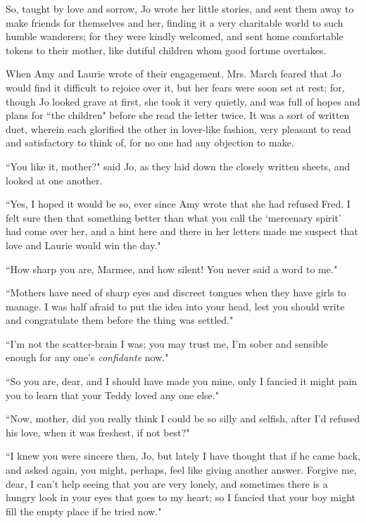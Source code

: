So, taught by love and sorrow, Jo wrote her little stories, and sent
them away to make friends for themselves and her, finding it a very
charitable world to such humble wanderers; for they were kindly
welcomed, and sent home comfortable tokens to their mother, like dutiful
children whom good fortune overtakes.

When Amy and Laurie wrote of their engagement, Mrs. March feared that Jo
would find it difficult to rejoice over it, but her fears were soon set
at rest; for, though Jo looked grave at first, she took it very quietly,
and was full of hopes and plans for ``the children" before she read the
letter twice. It was a sort of written duet, wherein each glorified the
other in lover-like fashion, very pleasant to read and satisfactory to
think of, for no one had any objection to make.

``You like it, mother?" said Jo, as they laid down the closely written
sheets, and looked at one another.

``Yes, I hoped it would be so, ever since Amy wrote that she had refused
Fred. I felt sure then that something better than what you call the
`mercenary spirit' had come over her,
and a hint here and there in her letters made me suspect that love and
Laurie would win the day."

``How sharp you are, Marmee, and how silent! You never said a word to
me."

``Mothers have need of sharp eyes and discreet tongues when they have
girls to manage. I was half afraid to put the idea into your head, lest
you should write and congratulate them before the thing was settled."

``I'm not the scatter-brain I was; you may trust me,
I'm sober and sensible enough for any
one's \emph{confidante} now."

``So you are, dear, and I should have made you mine, only I fancied it
might pain you to learn that your Teddy loved any one else."

``Now, mother, did you really think I could be so silly and selfish,
after I'd refused his love, when it was freshest, if not
best?"

``I knew you were sincere then, Jo, but lately I have thought that if he
came back, and asked again, you might, perhaps, feel like giving another
answer. Forgive me, dear, I can't help seeing that you
are very lonely, and sometimes there is a hungry look in your eyes that
goes to my heart; so I fancied that your boy might fill the empty place
if he tried now."

